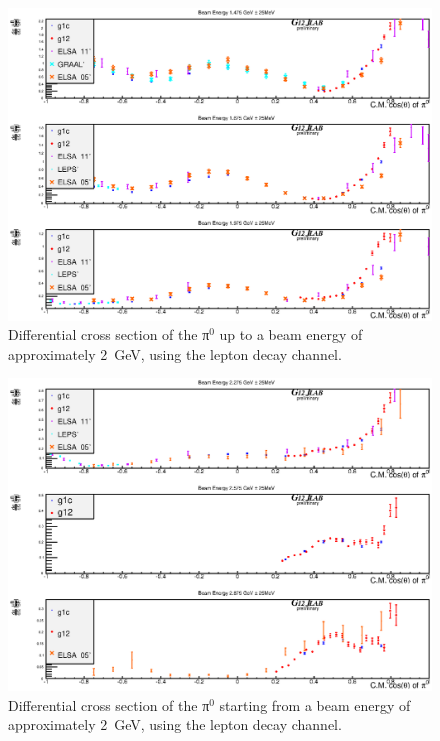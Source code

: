 \begin{figure}[htpb]\begin{center}
\includegraphics[width=0.95\columnwidth]{figures/xsec/G12_Pi0_XSection_forAnalysisNote_I.eps}
\caption{\label{fig:pi0.xsec.1}Differential cross section of the π$^0$ up to a beam energy of approximately 2~GeV, using the lepton decay channel.}
\end{center}\end{figure}

\begin{figure}[htpb]\begin{center}
\includegraphics[width=0.95\columnwidth]{figures/xsec/G12_Pi0_XSection_forAnalysisNote_II.eps}
\caption{\label{fig:pi0.xsec.2}Differential cross section of the π$^0$ starting from a beam energy of approximately 2~GeV, using the lepton decay channel.}
\end{center}\end{figure}

